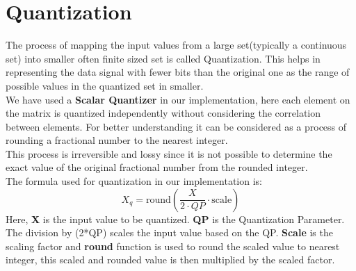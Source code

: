 \section{Quantization}
The process of mapping the input values from a large set(typically a continuous set) into smaller often finite sized set is called Quantization. This helps in representing the data signal with fewer bits than the original one as the range of possible values in the quantized set in smaller.\\
We have used a \textbf{Scalar Quantizer} in our implementation, here each element on the matrix is quantized independently without considering the correlation between elements. For better understanding it can be considered as a process of rounding a fractional number to the nearest integer.\\
This process is irreversible and lossy since it is not possible to determine the exact value of the original fractional number from the rounded integer.\\
The formula used for quantization in our implementation is:
\[
X_q = \text{round}\left(\frac{X}{{2 \cdot QP}} \cdot \text{scale}\right)
\]
Here, \textbf{X} is the input value to be quantized. \textbf{QP} is the Quantization Parameter. The division by (2*QP) scales the input value based on the QP. \textbf{Scale} is the scaling factor and \textbf{round} function is used to round the scaled value to nearest integer, this scaled and rounded value is then multiplied by the scaled factor.

